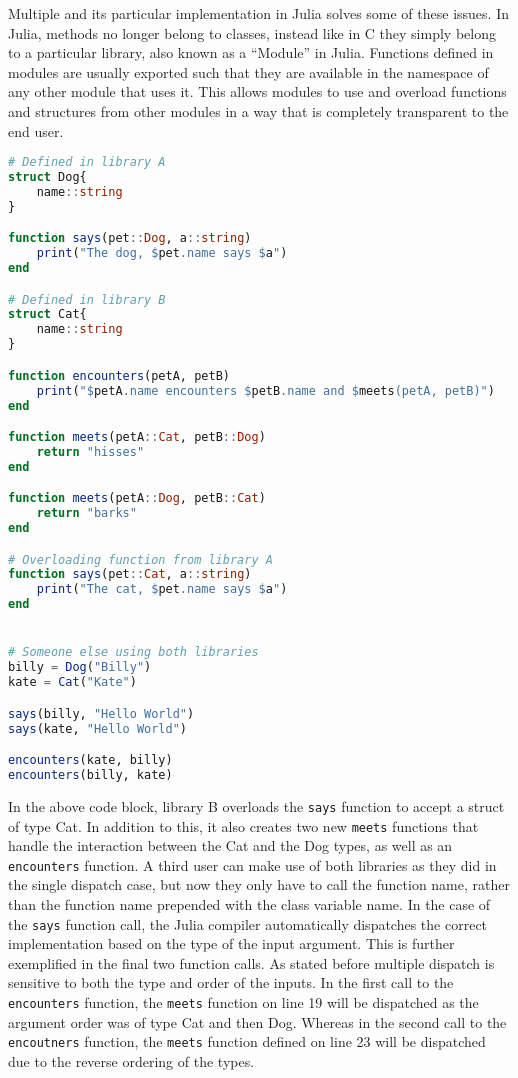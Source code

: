 Multiple and its particular implementation in Julia solves some of these issues. In Julia, methods no longer belong to
classes, instead like in C they simply belong to a particular library, also known as a ``Module'' in Julia. Functions
defined in modules are usually exported such that they are available in the namespace of any other module that uses it.
This allows modules to use and overload functions and structures from other modules in a way that is completely
transparent to the end user.   
\begin{lstlisting}[language=Julia]
# Defined in library A
struct Dog{
    name::string
}

function says(pet::Dog, a::string)
    print("The dog, $pet.name says $a")
end  

# Defined in library B 
struct Cat{
    name::string
}

function encounters(petA, petB)
    print("$petA.name encounters $petB.name and $meets(petA, petB)")
end

function meets(petA::Cat, petB::Dog)
    return "hisses"
end

function meets(petA::Dog, petB::Cat)
    return "barks"
end

# Overloading function from library A
function says(pet::Cat, a::string)
    print("The cat, $pet.name says $a")
end


# Someone else using both libraries
billy = Dog("Billy")
kate = Cat("Kate")

says(billy, "Hello World")
says(kate, "Hello World")

encounters(kate, billy)
encounters(billy, kate)
\end{lstlisting}
In the above code block, library B overloads the \lstinline[language=Julia]{says} function to accept a struct of type
Cat. In addition to this, it also creates two new \lstinline[language=Julia]{meets} functions that handle the
interaction between the Cat and the Dog types, as well as an \lstinline[language=Julia]{encounters} function. A third
user can make use of both libraries as they did in the single dispatch case, but now they only have to call the function
name, rather than the function name prepended with the class variable name. In the case of the
\lstinline[language=Julia]{says} function call, the Julia compiler automatically dispatches the correct implementation
based on the type of the input argument. This is further exemplified in the final two function calls. As stated before
multiple dispatch is sensitive to both the type and order of the inputs. In the first call to the
\lstinline[language=Julia]{encounters} function, the \lstinline[language=Julia]{meets} function on line 19 will be
dispatched as the argument order was of type Cat and then Dog. Whereas in the second call to the
\lstinline[language=Julia]{encoutners} function, the \lstinline[language=Julia]{meets} function defined on line 23 will
be dispatched due to the reverse ordering of the types.

